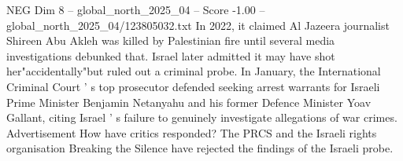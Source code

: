 \begin{textsample}{NEG Dim 8 – global\_north\_2025\_04 – Score -1.00 – global\_north\_2025\_04/123805032.txt}
In 2022, it claimed Al Jazeera journalist Shireen Abu Akleh was killed by Palestinian fire until several media investigations debunked that.
Israel later admitted it may have shot her"accidentally"but ruled out a criminal probe.
In January, the International Criminal Court ' s top prosecutor defended seeking arrest warrants for Israeli Prime Minister Benjamin Netanyahu and his former Defence Minister Yoav Gallant, citing Israel ' s failure to genuinely investigate allegations of war crimes.
Advertisement How have critics responded?
The PRCS and the Israeli rights organisation Breaking the Silence have rejected the findings of the Israeli probe.

\end{textsample}
